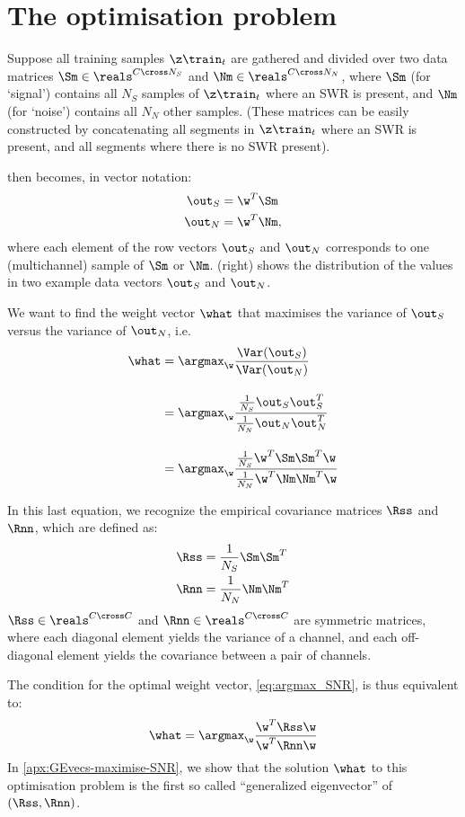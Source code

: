 \section{The optimisation problem}

Suppose all training samples $\z\train_t$ are gathered and divided over two data matrices $\Sm \in \reals^{C \cross N_S}$ and $\Nm \in \reals^{C \cross N_N}$, where $\Sm$ (for `signal') contains all $N_S$ samples of $\z\train_t$ where an SWR is present, and $\Nm$ (for `noise') contains all $N_N$ other samples. (These matrices can be easily constructed by concatenating all segments in $\z\train_t$ where an SWR is present, and all segments where there is no SWR present).

 then becomes, in vector notation:
%
\begin{align*}
\out_S &= \w^T \Sm \\
\out_N &= \w^T \Nm,
\end{align*}
where each element of the row vectors $\out_S$ and $\out_N$ corresponds to one (multichannel) sample of $\Sm$ or $\Nm$.  (right) shows the distribution of the values in two example data vectors $\out_S$ and $\out_N$.

We want to find the weight vector $\what$ that maximises the variance of $\out_S$ versus the variance of $\out_N$, i.e.
%
\begin{align}
\what &= \argmax_{\w} \frac{\Var(\out_S)}
                           {\Var(\out_N)}  \label{eq:argmax_SNR} \\[1em]
      &= \argmax_{\w} 
         \frac{\frac{1}{N_S} \out_S \out_S^T}
              {\frac{1}{N_N} \out_N \out_N^T}   \nonumber \\[1em]
      &= \argmax_{\w}
         \frac{\frac{1}{N_S} \w^T \Sm \Sm^T \w}
              {\frac{1}{N_N} \w^T \Nm \Nm^T \w}  \nonumber
\end{align}

In this last equation, we recognize the empirical covariance matrices $\Rss$ and $\Rnn$, which are defined as:
%
\begin{align}
\Rss &= \frac{1}{N_S} \Sm \Sm^T \label{eq:covariance_S}\\
\Rnn &= \frac{1}{N_N} \Nm \Nm^T \label{eq:covariance_N}
\end{align}
%
$\Rss \in \reals^{C \cross C}$ and $\Rnn \in \reals^{C \cross C}$ are symmetric matrices, where each diagonal element yields the variance of a channel, and each off-diagonal element yields the covariance between a pair of channels.

The condition for the optimal weight vector, \cref{eq:argmax_SNR}, is thus equivalent to:
%
\begin{equation}
\label{eq:argmax_R}
\what = \argmax_{\w} \frac{\w^T \Rss \w}
                          {\w^T \Rnn \w}
\end{equation}
%
In \cref{apx:GEvecs-maximise-SNR}, we show that the solution $\what$ to this optimisation problem is the first so called ``generalized eigenvector'' of $(\Rss, \Rnn)$.
